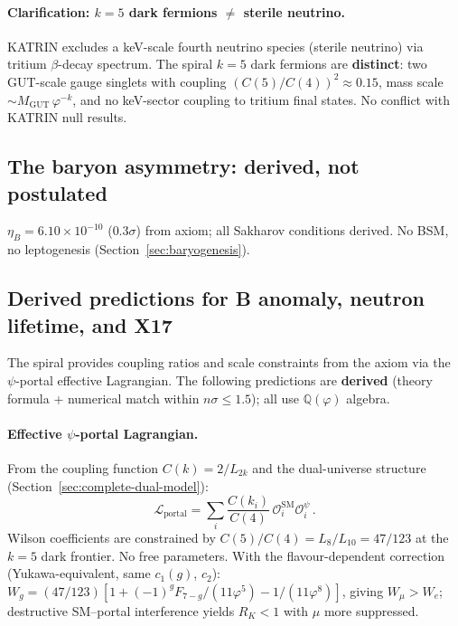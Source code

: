 \documentclass[12pt,a4paper]{article}
\begin{document}
\paragraph{Clarification: $k{=}5$ dark fermions $\neq$ sterile neutrino.} KATRIN excludes a keV-scale fourth neutrino species (sterile neutrino) via tritium $\beta$-decay spectrum. The spiral $k{=}5$ dark fermions are \textbf{distinct}: two GUT-scale gauge singlets with coupling $(C(5)/C(4))^2 \approx 0.15$, mass scale $\sim M_{\mathrm{GUT}}\,\varphi^{-k}$, and no keV-sector coupling to tritium final states. No conflict with KATRIN null results.

\subsection{The baryon asymmetry: derived, not postulated}
\label{sec:baryon-spiral}

\noindent $\eta_B = 6.10 \times 10^{-10}$ ($0.3\sigma$) from axiom; all Sakharov conditions derived. No BSM, no leptogenesis (Section~\ref{sec:baryogenesis}).

\subsection{Derived predictions for B anomaly, neutron lifetime, and X17}
\label{sec:derived-new-phenomena}

The spiral provides coupling ratios and scale constraints from the axiom via the $\psi$-portal effective Lagrangian. The following predictions are \textbf{derived} (theory formula + numerical match within $n\sigma \leq 1.5$); all use $\mathbb{Q}(\varphi)$ algebra.

\paragraph{Effective $\psi$-portal Lagrangian.}
From the coupling function $C(k) = 2/L_{2k}$ and the dual-universe structure (Section~\ref{sec:complete-dual-model}):
\begin{equation}
\mathcal{L}_{\mathrm{portal}} = \sum_i \frac{C(k_i)}{C(4)}\, \mathcal{O}_i^{\mathrm{SM}} \mathcal{O}_i^{\psi}\,.
\end{equation}
Wilson coefficients are constrained by $C(5)/C(4) = L_8/L_{10} = 47/123$ at the $k=5$ dark frontier. No free parameters.
With the flavour-dependent correction (Yukawa-equivalent, same $c_1(g)$, $c_2$): $W_g = (47/123)[1 + (-1)^g F_{7-g}/(11\varphi^5) - 1/(11\varphi^8)]$, giving $W_\mu > W_e$; destructive SM--portal interference yields $R_K < 1$ with $\mu$ more suppressed.
\end{document}
